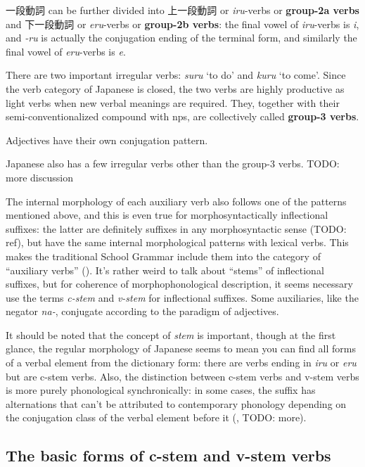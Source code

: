 \documentclass[UTF8, a4paper, oneside, scheme=plain]{ctexrep}
\newcommand*{\concept}[1]{\textbf{#1}}
\newcommand*{\term}[1]{\emph{#1}}
\newcommand{\corpus}[1]{\emph{#1}}
\newcommand{\translate}[1]{`#1'}
\begin{document}
一段動詞 can be further divided into 上一段動詞 or \corpus{iru}-verbs or \concept{group-2a verbs} 
and 下一段動詞 or \corpus{eru}-verbs or \concept{group-2b verbs}:
the final vowel of \corpus{iru}-verbs is \corpus{i},
and \corpus{-ru} is actually the conjugation ending of the terminal form,
and similarly the final vowel of \corpus{eru}-verbs is \corpus{e}.

There are two important irregular verbs: \corpus{suru} \translate{to do} 
and \corpus{kuru} \translate{to come}.
Since the verb category of Japanese is closed,
the two verbs are highly productive as light verbs when new verbal meanings are required.
They, together with their semi-conventionalized compound with \ac{np}s,
are collectively called \concept{group-3 verbs}.

Adjectives have their own conjugation pattern.

Japanese also has a few irregular verbs other than the group-3 verbs. TODO: more discussion

The internal morphology of each auxiliary verb also follows one of the patterns mentioned above,
and this is even true for morphosyntactically inflectional suffixes:
the latter are definitely suffixes in any morphosyntactic sense (TODO: ref),
but have the same internal morphological patterns with lexical verbs.
This makes the traditional School Grammar include them into the category of ``auxiliary verbs''
().
It's rather weird to talk about ``stems'' of inflectional suffixes,
but for coherence of morphophonological description,
it seems necessary use the terms \term{c-stem} and \term{v-stem} for inflectional suffixes.
Some auxiliaries, like the negator \corpus{na-},
conjugate according to the paradigm of adjectives.

It should be noted that the concept of \term{stem} is important,
though at the first glance, the regular morphology of Japanese seems to 
mean you can find all forms of a verbal element from the dictionary form:
there are verbs ending in \corpus{iru} or \corpus{eru} but are c-stem verbs.
Also, the distinction between c-stem verbs and v-stem verbs is more purely phonological synchronically:
in some cases, the suffix has alternations that can't be attributed to contemporary phonology 
depending on the conjugation class of the verbal element before it
(, TODO: more).

\subsection{The basic forms of c-stem and v-stem verbs}\label{sec:internal-forms}
\end{document}
